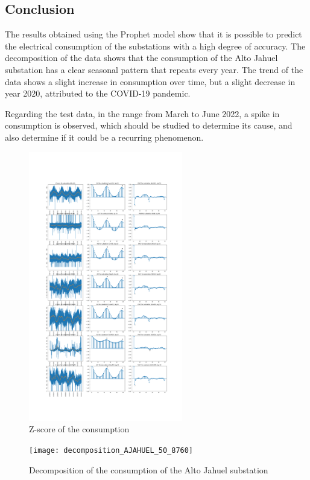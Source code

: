 \documentclass{ieeeaccess}
\begin{document}
\begin{enumerate}
\section{Conclusion}\label{s:conclusion}

The results obtained using the Prophet model show that it is possible to predict the electrical consumption of the substations with a high degree of accuracy.
The decomposition of the data shows that the consumption of the Alto Jahuel substation has a clear seasonal pattern that repeats every year.
The trend of the data shows a slight increase in consumption over time, but a slight decrease in year 2020, attributed to the COVID-19 pandemic.

Regarding the test data, in the range from March to June 2022, a spike in consumption is observed, which should be studied to determine its cause, and also determine if 
it could be a recurring phenomenon.

\begin{figure}[h]
	\centering
	\includegraphics[width=0.6\textwidth]{zscore_50.png}
	\caption{Z-score of the consumption}
	\label{fig:figure_zscore_50}
\end{figure}

\begin{figure}[h]
	\centering
	\texttt{[image: decomposition\_AJAHUEL\_50\_8760]}
	\caption{Decomposition of the consumption of the Alto Jahuel substation}
	\label{fig:figure_decomposition_AJAHUEL_50_8760}
\end{figure}


\end{enumerate}
\end{document}
